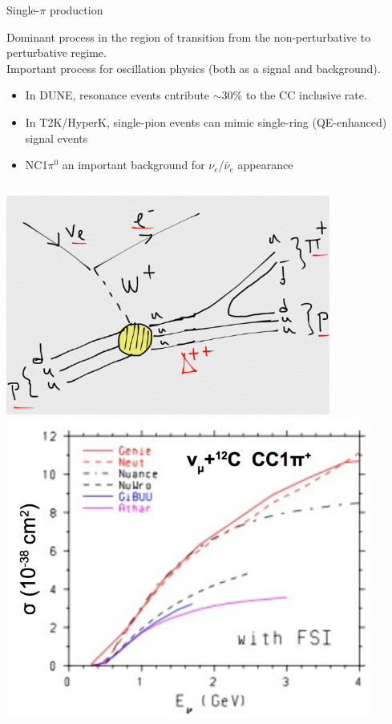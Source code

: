 %
%
%
\begin{frame}{Single-$\pi$ production}

  {\scriptsize
    Dominant process in the region of
    transition from the non-perturbative to perturbative regime.\\
    Important process for oscillation physics (both as a signal and background).
    \begin{itemize}
     \item In DUNE, resonance events cntribute $\sim$30\% to the CC inclusive rate.\\
     \item In T2K/HyperK, single-pion events can mimic single-ring (QE-enhanced) signal events\\
     \item NC1$\pi^{0}$ an important background for $\nu_{e}$/$\bar{\nu}_{e}$ appearance\\
   \end{itemize}
  }
  \begin{columns}
    \begin{column}{0.38\textwidth}
      \begin{center}
        \includegraphics[width=0.80\textwidth]{./images/nuint/feyn/ccDelta1pi_feynman_diagram_0}\\
        \includegraphics[width=0.90\textwidth]{./images/nuint/ccpi/sig1pi_various_models}\\

\end{center}
\end{column}
\end{columns}
\end{frame}
